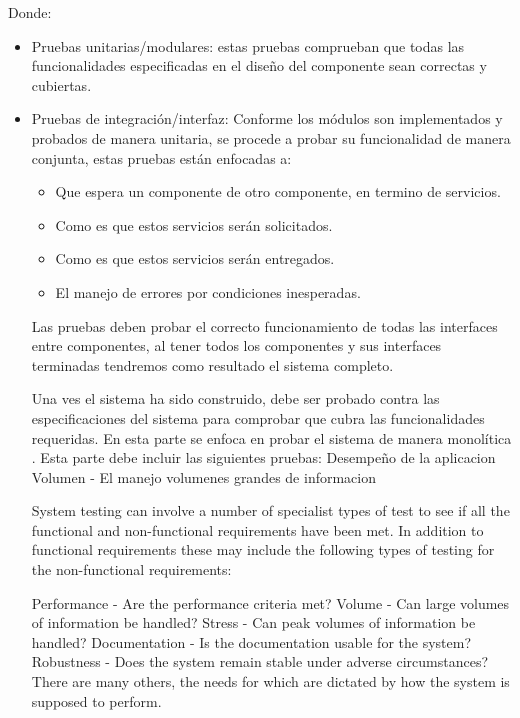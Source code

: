 Donde:
\begin{itemize}

    \item Pruebas unitarias/modulares: estas pruebas comprueban que todas las funcionalidades especificadas en el diseño del componente sean correctas y cubiertas.
    
    \item Pruebas de integración/interfaz:
    Conforme los módulos son implementados y probados de manera unitaria, se procede a probar su funcionalidad de manera conjunta, estas pruebas están enfocadas a:
    
    \begin{itemize}
        \item Que espera un componente de otro componente, en termino de servicios.
        \item Como es que estos servicios serán solicitados.
        \item Como es que estos servicios serán entregados.
        \item El manejo de errores por condiciones inesperadas.
    \end{itemize}
    
    Las pruebas deben probar el correcto funcionamiento de todas las interfaces entre componentes, al tener todos los componentes y sus interfaces terminadas tendremos como resultado el sistema completo.
    
    
Una ves el sistema ha sido construido, debe ser probado contra las especificaciones del sistema para comprobar que cubra las funcionalidades requeridas.
En esta parte se enfoca en probar el sistema de manera monolítica .
Esta parte debe incluir las siguientes pruebas:
Desempeño de la aplicacion
Volumen - El manejo volumenes grandes de informacion


System testing can involve a number of specialist types of test to see if all the functional and non-functional requirements have been met. In addition to functional requirements these may include the following types of testing for the non-functional requirements:

Performance - Are the performance criteria met?
Volume - Can large volumes of information be handled?
Stress - Can peak volumes of information be handled?
Documentation - Is the documentation usable for the system?
Robustness - Does the system remain stable under adverse circumstances?
There are many others, the needs for which are dictated by how the system is supposed to perform.    
    
\end{itemize}

